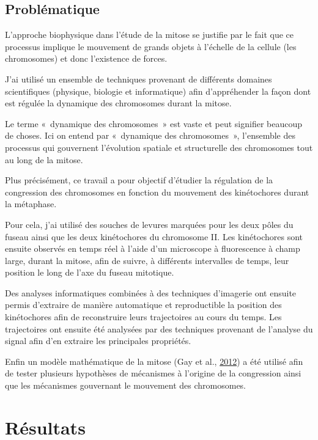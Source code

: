 \documentclass[12pt,a4paper,twoside,openright]{book}
\begin{document}
\section{Problématique}\label{probluxe9matique}

L'approche biophysique dans l'étude de la mitose se justifie par le fait
que ce processus implique le mouvement de grands objets à l'échelle de
la cellule (les chromosomes) et donc l'existence de forces.

J'ai utilisé un ensemble de techniques provenant de différents domaines
scientifiques (physique, biologie et informatique) afin d'appréhender la
façon dont est régulée la dynamique des chromosomes durant la mitose.

Le terme «~dynamique des chromosomes~» est vaste et peut signifier
beaucoup de choses. Ici on entend par «~dynamique des chromosomes~»,
l'ensemble des processus qui gouvernent l'évolution spatiale et
structurelle des chromosomes tout au long de la mitose.

Plus précisément, ce travail a pour objectif d'étudier la régulation de
la congression des chromosomes en fonction du mouvement des kinétochores
durant la métaphase.

Pour cela, j'ai utilisé des souches de levures marquées pour les deux
pôles du fuseau ainsi que les deux kinétochores du chromosome II. Les
kinétochores sont ensuite observés en temps réel à l'aide d'un
microscope à fluorescence à champ large, durant la mitose, afin de
suivre, à différents intervalles de temps, leur position le long de
l'axe du fuseau mitotique.

Des analyses informatiques combinées à des techniques d'imagerie ont
ensuite permis d'extraire de manière automatique et reproductible la
position des kinétochores afin de reconstruire leurs trajectoires au
cours du temps. Les trajectoires ont ensuite été analysées par des
techniques provenant de l'analyse du signal afin d'en extraire les
principales propriétés.

Enfin un modèle mathématique de la mitose (Gay et al.,
\protect\hyperlink{ref-Gay2012a}{2012}) a été utilisé afin de tester
plusieurs hypothèses de mécanismes à l'origine de la congression ainsi
que les mécanismes gouvernant le mouvement des chromosomes.

\clearpage\null

\chapter{Résultats}\label{ruxe9sultats}
\end{document}
